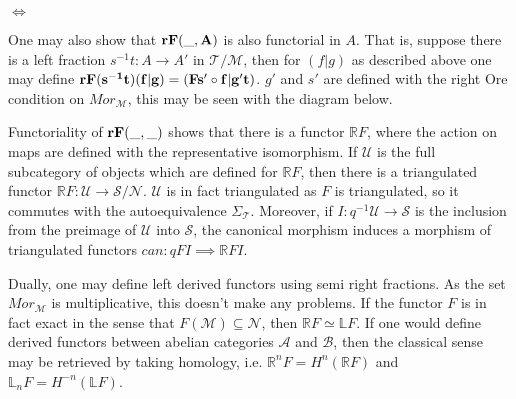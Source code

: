         \begin{center}
             $\iff$
        \end{center}

        One may also show that $\bf{r}F(\_,A)$ is also functorial in $A$. That is, suppose there is a left fraction $s^{-1}t:A\rightarrow A'$ in $\mathcal{T}/\mathcal{M}$, then for $(f|g)$ as described above one may define $\bf{r}F(s^{-1}t)(f|g)=(Fs'\circ f|g't)$. $g'$ and $s'$ are defined with the right Ore condition on $Mor_{\mathcal{M}}$, this may be seen with the diagram below.

        \begin{center}
        \end{center}

        Functoriality of $\bf{r}F(\_,\_)$ shows that there is a functor $\mathbb{R}F$, where the action on maps are defined with the representative isomorphism. If $\mathcal{U}$ is the full subcategory of objects which are defined for $\mathbb{R}F$, then there is a triangulated functor $\mathbb{R}F:\mathcal{U}\rightarrow \mathcal{S}/\mathcal{N}$. $\mathcal{U}$ is in fact triangulated as $F$ is triangulated, so it commutes with the autoequivalence $\Sigma_{\mathcal{T}}$. Moreover, if $I:q^{-1}\mathcal{U}\rightarrow \mathcal{S}$ is the inclusion from the preimage of $\mathcal{U}$ into $\mathcal{S}$, the canonical morphism induces a morphism of triangulated functors $can:qFI\implies\mathbb{R}FI$.

        Dually, one may define left derived functors using semi right fractions. As the set $Mor_{\mathcal{M}}$ is multiplicative, this doesn't make any problems. If the functor $F$ is in fact exact in the sense that $F(\mathcal{M})\subseteq \mathcal{N}$, then $\mathbb{R}F \simeq \mathbb{L}F$. If one would define derived functors between abelian categories $\mathcal{A}$ and $\mathcal{B}$, then the classical sense may be retrieved by taking homology, i.e. $\mathbb{R}^nF = H^n(\mathbb{R}F)$ and $\mathbb{L}_nF = H^{-n}(\mathbb{L}F)$.
        

